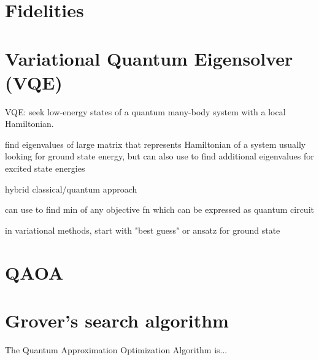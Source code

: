\documentclass[a4paper,landscape,columns=3]{CheatSheet}
\begin{document}
\section{Fidelities}


\section{Variational Quantum Eigensolver (VQE)}


VQE: seek low-energy states of a quantum many-body system with a local Hamiltonian.

find eigenvalues of large matrix that represents Hamiltonian of a system
usually looking for ground state energy, but can also use to find additional eigenvalues for excited state energies

hybrid classical/quantum approach

can use to find min of any objective fn which can be expressed as quantum circuit

in variational methods, start with "best guess" or ansatz for ground state





\section{QAOA}

\section{Grover's search algorithm}

The Quantum Approximation Optimization Algorithm is...

%
%

%
\end{document}
